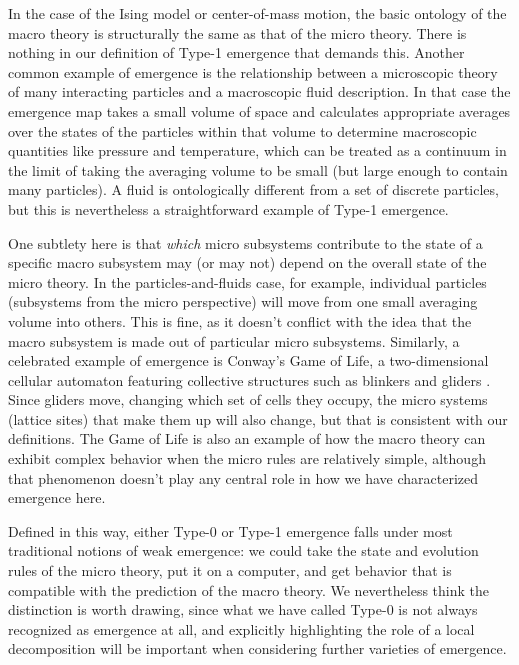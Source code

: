 \documentclass[12pt,english]{article}
\newcommand{\autocite}{\cite}
\begin{document}
In the case of the Ising model or center-of-mass motion, the basic ontology of the macro theory is structurally the same as that of the micro theory.
There is nothing in our definition of Type-1 emergence that demands this.
Another common example of emergence is the relationship between a microscopic theory of many interacting particles and a macroscopic fluid description.
In that case the emergence map takes a small volume of space and calculates appropriate averages over the states of the particles within that volume to determine macroscopic quantities like pressure and temperature, which can be treated as a continuum in the limit of taking the averaging volume to be small (but large enough to contain many particles).
A fluid is ontologically different from a set of discrete particles, but this is nevertheless a straightforward example of Type-1 emergence.

One subtlety here is that \emph{which} micro subsystems contribute to the state of a specific macro subsystem may (or may not) depend on the overall state of the micro theory.
In the particles-and-fluids case, for example, individual particles (subsystems from the micro perspective) will move from one small averaging volume into others.
This is fine, as it doesn't conflict with the idea that the macro subsystem is made out of particular micro subsystems.
Similarly, a celebrated example of emergence is Conway's Game of Life, a two-dimensional cellular automaton featuring collective structures such as blinkers and gliders \autocite{izhikevich2015game,Bedau1997-BEDWE}.
Since gliders move, changing which set of cells they occupy, the micro systems (lattice sites) that make them up will also change, but that is consistent with our definitions.
The Game of Life is also an example of how the macro theory can exhibit complex behavior when the micro rules are relatively simple, although that phenomenon doesn't play any central role in how we have characterized emergence here.

Defined in this way, either Type-0 or Type-1 emergence falls under most traditional notions of weak emergence: we could take the state and evolution rules of the micro theory, put it on a computer, and get behavior that is compatible with the prediction of  the macro theory. 
We nevertheless think the distinction is worth drawing, since what we have called Type-0 is not always recognized as emergence at all, and explicitly highlighting the role of a local decomposition will be important when considering further varieties of emergence.
\end{document}
